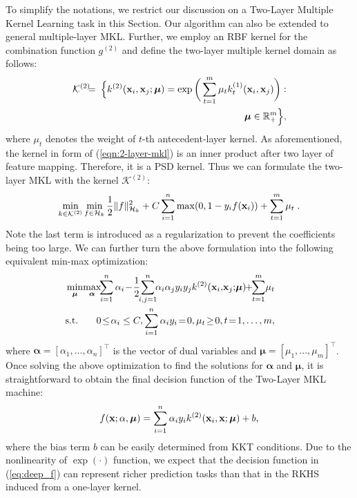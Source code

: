To simplify the notations, we restrict our discussion on a Two-Layer Multiple Kernel Learning task in this Section.
Our algorithm can also be extended to general multiple-layer MKL. Further, we employ an RBF kernel for the combination
function $g^{(2)}$ and define the two-layer multiple kernel domain as follows:
\begin{eqnarray}
\mathcal{K}^{(2)} \!\!\!&=&\!\!\!\Big\{k^{(2)}(\x_i, \x_j; \bm\mu) =
\exp\bigg(\sum_{t=1}^m \mu_t k_t^{(1)}(\x_i, \x_j)\bigg): \nonumber\\
&&\bm\mu\in\mathbb{R}_+^{m} \Big\},\label{eqn:2-layer-mkl}
\end{eqnarray}
where $\mu_t$ denotes the weight of $t$-th antecedent-layer kernel. As aforementioned,  the kernel in form of (\ref{eqn:2-layer-mkl}) is an inner product after two layer of feature mapping. Therefore, it is a PSD kernel.
Thus we can formulate the two-layer MKL with the kernel $\mathcal K^{(2)}$:
\[\min_{k \in {\mathcal K}^{(2)}}
\min_{f \in {\mathcal H}_k}  \frac{1}{2}\|f\|_{{\mathcal H}_k}^2 + C\sum_{i=1}^n \max(0,1-y_i f({\bf x}_i))
+ \sum_{t=1}^{m} \mu_t\;.\]
Note the last term is introduced as a regularization to
prevent the coefficients being too large. We can further turn the above formulation into the
following equivalent min-max optimization:
\begin{eqnarray}
\hspace{-0.7cm}&\min_{\bm\mu}\!\max_{\ba}\!&\hspace{-0.35cm}\sum_{i=1}^n\a_i \!-\!
\frac{1}{2}\!\!\sum_{i,j=1}^n\!\! \a_i\a_jy_iy_jk^{(2)}(\x_i, \!\x_j;\!\bm\mu)
\!\!+\!\! \sum_{t=1}^{m}\!\mu_t  \nonumber\\
\hspace{-1cm}&\st&\hspace{-0.8cm} 0 \!\leq\! \a_i \leq C,\sum_{i=1}^n \a_iy_i \!=\! 0,\mu_t \!\geq\! 0, t \!=\! 1,\ldots,m,\label{eqn:obj}
\end{eqnarray}
where $\bm\alpha=[\alpha_1,\ldots,\alpha_n]^\top$ is the vector of dual variables and $\bm\mu=[\mu_1,\ldots,\mu_{m}]^\top$. Once solving the above
optimization to find the solutions for $\bm\alpha$ and $\bm\mu$, it is straightforward
to obtain the final decision function of the Two-Layer MKL machine:
\begin{eqnarray}\label{eq:deep_f}
f(\mathbf{x};\alpha,\bm\mu) = \sum_{i=1}^n \alpha_i y_i k^{(2)}(\x_i,\x;\bm\mu)+b,
\end{eqnarray}
where the bias term $b$ can be easily determined from KKT conditions. Due to the nonlinearity of $\exp(\cdot)$ function, we expect that the decision function in (\ref{eq:deep_f}) can represent richer prediction tasks than that in the RKHS induced from a one-layer kernel.

